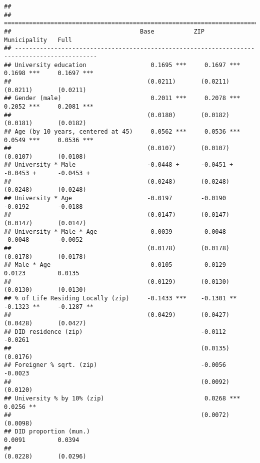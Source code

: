 \documentclass[
]{article}
\begin{document}
\begin{verbatim}
## 
## =============================================================================================
##                                    Base           ZIP            Municipality   Full         
## ---------------------------------------------------------------------------------------------
## University education                  0.1695 ***     0.1697 ***     0.1698 ***     0.1697 ***
##                                      (0.0211)       (0.0211)       (0.0211)       (0.0211)   
## Gender (male)                         0.2011 ***     0.2078 ***     0.2052 ***     0.2081 ***
##                                      (0.0180)       (0.0182)       (0.0181)       (0.0182)   
## Age (by 10 years, centered at 45)     0.0562 ***     0.0536 ***     0.0549 ***     0.0536 ***
##                                      (0.0107)       (0.0107)       (0.0107)       (0.0108)   
## University * Male                    -0.0448 +      -0.0451 +      -0.0453 +      -0.0453 +  
##                                      (0.0248)       (0.0248)       (0.0248)       (0.0248)   
## University * Age                     -0.0197        -0.0190        -0.0192        -0.0188    
##                                      (0.0147)       (0.0147)       (0.0147)       (0.0147)   
## University * Male * Age              -0.0039        -0.0048        -0.0048        -0.0052    
##                                      (0.0178)       (0.0178)       (0.0178)       (0.0178)   
## Male * Age                            0.0105         0.0129         0.0123         0.0135    
##                                      (0.0129)       (0.0130)       (0.0130)       (0.0130)   
## % of Life Residing Locally (zip)     -0.1433 ***    -0.1301 **     -0.1323 **     -0.1287 ** 
##                                      (0.0429)       (0.0427)       (0.0428)       (0.0427)   
## DID residence (zip)                                 -0.0112                       -0.0261    
##                                                     (0.0135)                      (0.0176)   
## Foreigner % sqrt. (zip)                             -0.0056                       -0.0023    
##                                                     (0.0092)                      (0.0120)   
## University % by 10% (zip)                            0.0268 ***                    0.0256 ** 
##                                                     (0.0072)                      (0.0098)   
## DID proportion (mun.)                                               0.0091         0.0394    
##                                                                    (0.0228)       (0.0296)   

\end{verbatim}
\end{document}
